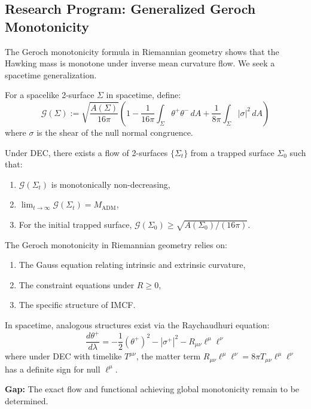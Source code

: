 \subsection{Research Program: Generalized Geroch Monotonicity}

The Geroch monotonicity formula in Riemannian geometry shows that the Hawking mass is monotone under inverse mean curvature flow. We seek a spacetime generalization.

\begin{definition}\label{def:SpacetimeGeroch}
For a spacelike 2-surface $\Sigma$ in spacetime, define:
\begin{equation}
    \mathcal{G}(\Sigma) := \sqrt{\frac{A(\Sigma)}{16\pi}} \left(1 - \frac{1}{16\pi} \int_\Sigma \theta^+ \theta^- \, dA + \frac{1}{8\pi} \int_\Sigma |\sigma|^2 \, dA\right)
\end{equation}
where $\sigma$ is the shear of the null normal congruence.
\end{definition}

\begin{conjecture}\label{conj:GeneralizedGeroch}
Under DEC, there exists a flow of 2-surfaces $\{\Sigma_t\}$ from a trapped surface $\Sigma_0$ such that:
\begin{enumerate}
    \item $\mathcal{G}(\Sigma_t)$ is monotonically non-decreasing,
    \item $\lim_{t \to \infty} \mathcal{G}(\Sigma_t) = M_{\mathrm{ADM}}$,
    \item For the initial trapped surface, $\mathcal{G}(\Sigma_0) \geq \sqrt{A(\Sigma_0)/(16\pi)}$.
\end{enumerate}
\end{conjecture}

\begin{remark}
The Geroch monotonicity in Riemannian geometry relies on:
\begin{enumerate}
    \item The Gauss equation relating intrinsic and extrinsic curvature,
    \item The constraint equations under $R \geq 0$,
    \item The specific structure of IMCF.
\end{enumerate}
In spacetime, analogous structures exist via the Raychaudhuri equation:
\begin{equation}
    \frac{d\theta^+}{d\lambda} = -\frac{1}{2}(\theta^+)^2 - |\sigma^+|^2 - R_{\mu\nu} \ell^\mu \ell^\nu
\end{equation}
where under DEC with timelike $T^{\mu\nu}$, the matter term $R_{\mu\nu}\ell^\mu \ell^\nu = 8\pi T_{\mu\nu} \ell^\mu \ell^\nu$ has a definite sign for null $\ell^\mu$.

\textbf{Gap:} The exact flow and functional achieving global monotonicity remain to be determined.
\end{remark}

